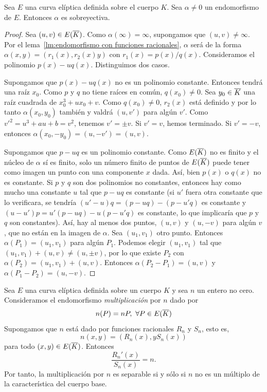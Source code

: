 \begin{proposicion}\label{pp:sobreyectividad endomorfismos}
	Sea $E$ una curva elíptica definida sobre el cuerpo $K$. Sea $\alpha \neq 0$ un endomorfismo de $E$. Entonces $\alpha$ es sobreyectiva.
\end{proposicion}
\begin{proof}
Sea $(u, v) \in E(\overline{K})$. Como $\alpha(\infty) = \infty$, supongamos que $(u, v) \neq \infty$. Por el lema~\ref{lm:endomorfismo con funciones racionales}, $\alpha$ será de la forma $\alpha(x, y) = (r_1(x), r_2(x) y)$ con $r_1(x) = p(x) / q(x)$. Consideramos el polinomio $p(x) - u q(x)$. Distinguimos dos casos.

Supongamos que $p(x) - u q(x)$ no es un polinomio constante. Entonces tendrá una raíz $x_0$. Como $p$ y $q$ no tiene raíces en común, $q(x_0) \neq 0$. Sea $y_0 \in \overline{K}$ una raíz cuadrada de $x_0^3 + u x_0 + v$. Como $q(x_0) \neq 0$, $r_2(x)$ está definido y por lo tanto $\alpha(x_0, y_0)$ también y valdrá $(u, v')$ para algún $v'$. Como $v'^2 = u^3 + a u + b = v^2$, tenemos $v' = \pm v$. Si $v' = v$, hemos terminado. Si $v' = -v$, entonces $\alpha(x_0, -y_0) = (u, -v') = (u, v)$.

Supongamos que $p - uq$ es un polinomio constante. Como $E(\overline{K})$ no es finito y el núcleo de $\alpha$ sí es finito, solo un número finito de puntos de $E(\overline{K})$ puede tener como imagen un punto con una componente $x$ dada. Así, bien $p(x)$ o $q(x)$ no es constante. Si $p$ y $q$ son dos polinomios no constantes, entonces hay como mucho una constante $u$ tal que $p - uq$ es constante (si $u'$ fuera otra constante que lo verificara, se tendría $(u' - u)q = (p - u q) - (p - u' q)$ es constante y $(u - u') p = u' (p - u q) - u (p - u' q)$ es constante, lo que implicaría que $p$ y $q$ son constantes). Así, hay al menos dos puntos, $(u, v)$ y $(u, -v)$ para algún $v$, que no están en la imagen de $\alpha$. Sea $(u_1, v_1)$ otro punto. Entonces $\alpha(P_1) = (u_1, v_1)$ para algún $P_1$. Podemos elegir $(u_1, v_1)$ tal que $(u_1, v_1) + (u, v) \neq (u, \pm v)$, por lo que existe $P_2$ con $\alpha(P_2) = (u_1, v_1) + (u, v)$. Entonces $\alpha(P_2 - P_1) = (u, v)$ y $\alpha(P_1 - P_2) = (u, -v)$.

\end{proof}

\begin{proposicion}\label{pp:endomorfismo multiplicación}
	Sea $E$ una curva elíptica definida sobre un cuerpo $K$ y sea $n$ un entero no cero. Consideramos el endomorfismo \emph{multiplicación} por $n$  dado por
	$$
		n(P) = n P,\ \forall P \in E(\overline{K})
	$$
	Supongamos que $n$ está dado por funciones racionales $R_n$ y $S_n$, esto es,
	$$
		n(x, y) = (R_n(x), y S_n(x))
	$$
	para todo $(x, y) \in E(\overline{K})$. Entonces
	$$
		\frac{R_n'(x)}{S_n(x)} = n.
	$$
	Por tanto, la multiplicación por $n$ es separable si y sólo si $n$ no es un múltiplo de la característica del cuerpo base.
\end{proposicion}

